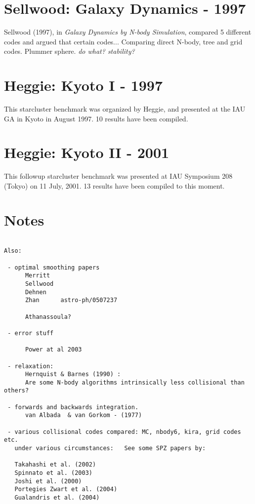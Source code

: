 {\section{Sellwood: Galaxy Dynamics - 1997}

Sellwood (1997), in {\it Galaxy Dynamics by N-body Simulation},
compared 5 different codes and argued that certain codes...
Comparing direct N-body, tree and grid codes. Plummer
sphere. {\it do what? stability?}


\section{Heggie: Kyoto I - 1997}

This starcluster benchmark was 
organized by Heggie, and presented at the IAU GA in Kyoto in August 1997. 10 results
have been compiled.

\section{Heggie: Kyoto II - 2001}

This followup starcluster benchmark was 
presented at IAU Symposium 208 (Tokyo) on 11 July, 2001. 13 results
have been compiled to this moment.

\section{Notes}
\begin{verbatim}

Also:

 - optimal smoothing papers
      Merritt
      Sellwood
      Dehnen
      Zhan      astro-ph/0507237

      Athanassoula?

 - error stuff

      Power at al 2003

 - relaxation:
      Hernquist & Barnes (1990) : 
      Are some N-body algorithms intrinsically less collisional than others?

 - forwards and backwards integration. 
      van Albada  & van Gorkom - (1977)

 - various collisional codes compared: MC, nbody6, kira, grid codes etc.
   under various circumstances:   See some SPZ papers by:

   Takahashi et al. (2002)
   Spinnato et al. (2003)  
   Joshi et al. (2000)
   Portegies Zwart et al. (2004)
   Gualandris et al. (2004)


\end{verbatim}}
